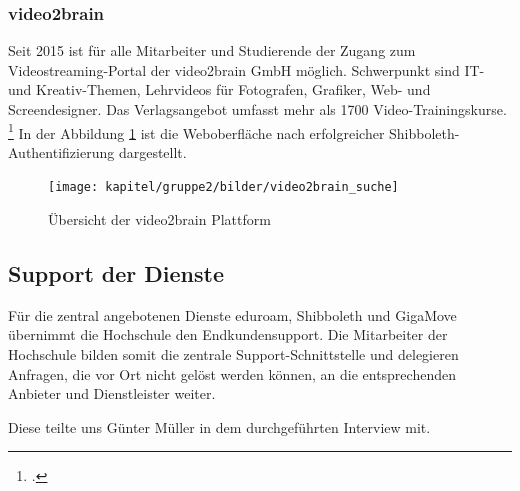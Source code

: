 \subsubsection{video2brain}
Seit 2015 ist für alle Mitarbeiter und Studierende der Zugang zum Videostreaming-Portal der video2brain GmbH möglich. Schwerpunkt sind IT- und Kreativ-Themen, Lehrvideos für Fotografen, Grafiker, Web- und Screendesigner. Das Verlagsangebot umfasst mehr als 1700 Video-Trainingskurse. \footcite{adsgmbh_video2brain_2013} In der Abbildung \ref{fig_video2brain_suchergebnis} ist die Weboberfläche nach erfolgreicher Shibboleth-Authentifizierung dargestellt.

\begin{figure}[h!]
	\centering
	\texttt{[image: kapitel/gruppe2/bilder/video2brain\_suche]}
	\caption{Übersicht der video2brain Plattform \protect\footnotemark}
	\label{fig_video2brain_suchergebnis}
\end{figure}

\subsection{Support der Dienste}
Für die zentral angebotenen Dienste eduroam, Shibboleth und GigaMove übernimmt die Hochschule den Endkundensupport. Die Mitarbeiter der Hochschule bilden somit die zentrale Support-Schnittstelle und delegieren Anfragen, die vor Ort nicht gelöst werden können, an die entsprechenden Anbieter und Dienstleister weiter.

Diese teilte uns Günter Müller in dem durchgeführten Interview mit.